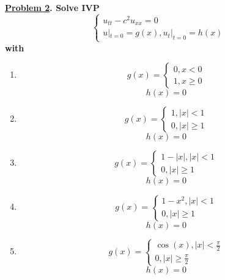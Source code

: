 \documentclass{article}
\theoremstyle{definition}
\newenvironment{boldenv}{\bfseries\boldmath}{}
\begin{document}
\begin{boldenv}
    \underline{Problem 2}. Solve IVP
        \[\begin{cases}
        u_{tt} - c^2u_{xx} = 0\\
        u|_{t=0}=g(x), u_t|_{t=0} = h(x)
    \end{cases}\]
    with \begin{enumerate}[start=7, resume*=problems]
        \item \begin{equation*}
        g(x) =
        \begin{cases}
            0, x<0\\
            1, x\geq0
        \end{cases}
        \end{equation*}
        \[h(x) = 0\]
        
        \item \begin{equation*}
        g(x) =
        \begin{cases}
            1, |x|<1\\
            0, |x|\geq1
        \end{cases}
        \end{equation*}
        \[h(x) = 0\]
        
        \item \begin{equation*}
        g(x) =
        \begin{cases}
            1-|x|, |x|<1\\
            0, |x|\geq1
        \end{cases}
        \end{equation*}
        \[h(x) = 0\]
        
        
        \item \begin{equation*}
        g(x) =
        \begin{cases}
            1-x^2, |x|<1\\
            0, |x|\geq1
        \end{cases}
        \end{equation*}
        \[h(x) = 0\]
        
        \item \begin{equation*}
        g(x) =
        \begin{cases}
            \cos{(x)}, |x|<\frac{\pi}{2}\\
            0, |x|\geq\frac{\pi}{2}
        \end{cases}
        \end{equation*}
        \[h(x) = 0\]
        

\end{enumerate}
\end{boldenv}
\end{document}
